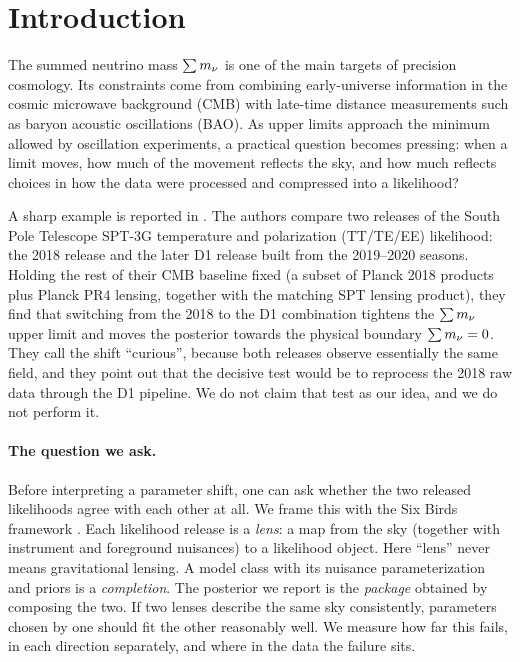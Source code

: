 \section{Introduction}
\label{sec:intro}

The summed neutrino mass $\sum m_\nu$ is one of the main targets of precision cosmology. Its constraints come from combining early-universe information in the cosmic microwave background (CMB) with late-time distance measurements such as baryon acoustic oscillations (BAO). As upper limits approach the minimum allowed by oscillation experiments, a practical question becomes pressing: when a limit moves, how much of the movement reflects the sky, and how much reflects choices in how the data were processed and compressed into a likelihood?

A sharp example is reported in \cite{arxiv2601_16277}. The authors compare two releases of the South Pole Telescope SPT-3G temperature and polarization (TT/TE/EE) likelihood: the 2018 release and the later D1 release built from the 2019--2020 seasons. Holding the rest of their CMB baseline fixed (a subset of Planck 2018 products plus Planck PR4 lensing, together with the matching SPT lensing product), they find that switching from the 2018 to the D1 combination tightens the $\sum m_\nu$ upper limit and moves the posterior towards the physical boundary $\sum m_\nu=0$. They call the shift ``curious'', because both releases observe essentially the same field, and they point out that the decisive test would be to reprocess the 2018 raw data through the D1 pipeline. We do not claim that test as our idea, and we do not perform it.

\paragraph{The question we ask.}
Before interpreting a parameter shift, one can ask whether the two released likelihoods agree with each other at all. We frame this with the Six Birds framework \cite{sixbirds_foundations,sixbirds_darkenergy}. Each likelihood release is a \emph{lens}: a map from the sky (together with instrument and foreground nuisances) to a likelihood object. Here ``lens'' never means gravitational lensing. A model class with its nuisance parameterization and priors is a \emph{completion}. The posterior we report is the \emph{package} obtained by composing the two. If two lenses describe the same sky consistently, parameters chosen by one should fit the other reasonably well. We measure how far this fails, in each direction separately, and where in the data the failure sits.

